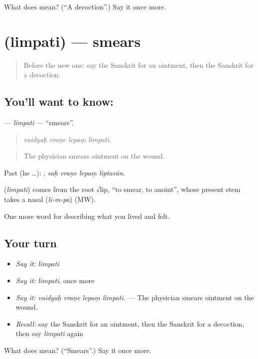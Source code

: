 \begin{tcolorbox}[breakable,colback=teal!4,colframe=teal!35!black,title={Before you move on}]
What does  mean? (\textquotedblleft{}A decoction\textquotedblright{}.) Say it once more.
\end{tcolorbox}
\section[\texorpdfstring{\sk{लिम्पति} (limpati)}{लिम्पति (limpati)}]{ (limpati) — smears}

\label{lesson:SA-C483-limpati}



\begin{quote}
Before the new one: say the Sanskrit for an ointment, then the Sanskrit for a decoction.
\end{quote}

\subsection*{You'll want to know: }
\textbf{} — \emph{limpati} — \textquotedblleft{}smears\textquotedblright{}.

\begin{quote}
   
\end{quote}

\begin{quote}
\emph{vaidyaḥ vraṇe lepaṃ limpati.}
\end{quote}

\begin{quote}
The physician smears ointment on the wound.
\end{quote}

Past (he …):    , \emph{saḥ vraṇe lepaṃ liptavān}.

\begin{cousinweb}
\textbf{} (\emph{limpati}) comes from the root √lip, \textquotedblleft{}to smear, to anoint\textquotedblright{}, whose present stem takes a nasal (\emph{li-m-pa}) (MW).
\end{cousinweb}

\begin{grammarlens}[title={What you've built}]
One more word for describing what you lived and felt.
\end{grammarlens}

\subsection*{Your turn}
\begin{itemize}
\raggedright
  \item \emph{Say it:} \emph{limpati}
  \item \emph{Say it:} \emph{limpati}, once more
  \item \emph{Say it:} \emph{vaidyaḥ vraṇe lepaṃ limpati.} — The physician smears ointment on the wound.
  \item \emph{Recall:} say the Sanskrit for an ointment, then the Sanskrit for a decoction, then say \emph{limpati} again
\end{itemize}

\begin{tcolorbox}[breakable,colback=teal!4,colframe=teal!35!black,title={Before you move on}]
What does  mean? (\textquotedblleft{}Smears\textquotedblright{}.) Say it once more.
\end{tcolorbox}

